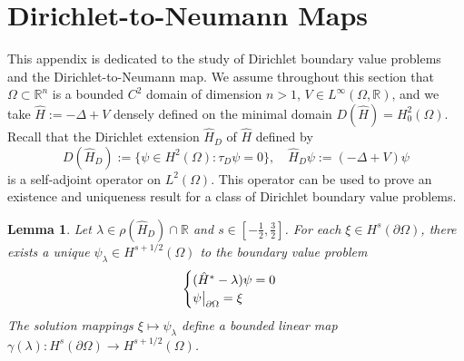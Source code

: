 \documentclass{article}
\numberwithin{equation}{section}
\newtheorem{lemma}{Lemma}[section]
\begin{document}
\section{Dirichlet-to-Neumann Maps}\label{D to N section}
This appendix is dedicated to the study of Dirichlet boundary value problems and the Dirichlet-to-Neumann map. We assume throughout this section that $\Omega \subset \mathbb{R}^n$ is a bounded $C^2$ domain of dimension $n>1$, $V \in L^\infty(\Omega,\mathbb{R})$, and we take $\hat{H}:=-\Delta+V$ densely defined on the minimal domain $D(\hat{H})=H^2_0(\Omega)$. Recall that the Dirichlet extension $\hat{H}_D$ of $\hat{H}$ defined by
\begin{equation}
    D(\hat{H}_D):=\{ \psi \in H^2(\Omega): \tau_D \psi=0\}, \quad \hat{H}_D\psi:=(-\Delta +V)\psi
\end{equation}
is a self-adjoint operator on $L^2(\Omega)$. This operator can be used to prove an existence and uniqueness result for a class of Dirichlet boundary value problems.
\begin{lemma}\label{Dirichlet solution properties}
    Let $\lambda \in \rho(\hat{H}_D)\cap \mathbb{R}$ and $s \in [-\frac{1}{2},\frac{3}{2}]$. For each $\xi \in H^{s}(\partial \Omega)$, there exists a unique $\psi_\lambda \in H^{s+1/2}(\Omega)$ to the boundary value problem
    \begin{equation}\label{Boundary value problem}
        \begin{cases}
            (\hat{H}^*-\lambda)\psi=0
            \\
            \psi \big{|}_{\partial \Omega}=\xi
        \end{cases}
    \end{equation}
    The solution mappings $\xi \mapsto\psi_\lambda$ define a bounded linear map $\gamma(\lambda):H^s(\partial \Omega)\to H^{s+1/2}(\Omega)$.
    \end{lemma}
\end{document}
